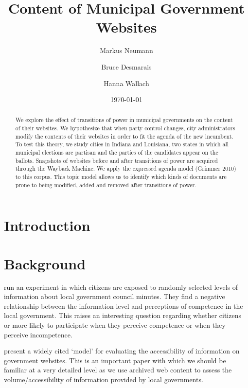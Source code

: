 \documentclass[11pt]{article}
\title{\vspace{-2cm} Content of Municipal Government Websites }
\author{ Markus Neumann \and Bruce Desmarais \and Hanna Wallach} \date{\today}
\begin{document}
\maketitle




\begin{abstract}

\noindent We explore the effect of transitions of power in municipal governments on the content of their websites. We hypothesize that when party control changes, city administrators modify the contents of their websites in order to fit the agenda of the new incumbent. To test this theory, we study cities in Indiana and Louisiana, two states in which all municipal elections are partisan and the parties of the candidates appear on the ballots. Snapshots of websites before and after transitions of power are acquired through the Wayback Machine. We apply the expressed agenda model (Grimmer 2010) to this corpus. This topic model allows us to identify which kinds of documents are prone to being modified, added and removed after transitions of power.

\end{abstract}
\thispagestyle{empty}
\section{Introduction}

\section{Background}

\cite{grimmelikhuijsen2010transparency} run an experiment in which citizens are exposed to randomly selected levels of information about local government council minutes. They find a negative relationship between the information level and perceptions of competence in the local government. This raises an interesting question regarding whether citizens or more likely to participate when they perceive competence or when they perceive incompetence.

\cite{wang2005evaluating} present a widely cited `model' for evaluating the accessibility of information on government websites. This is an important paper with which we should be familiar at a very detailed level as we use archived web content to assess the volume/accessibility of information provided by local governments.
\end{document}
